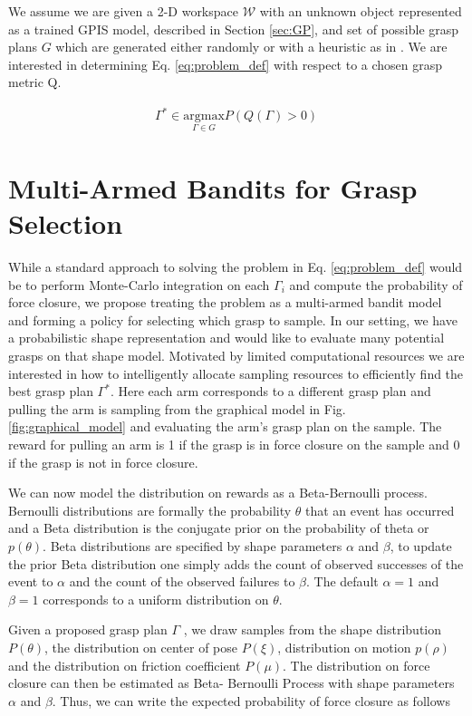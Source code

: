 \documentclass[journal,transmag]{IEEEtran}%
\begin{document}
We assume we are given a 2-D workspace $\mathcal{W}$ with an unknown object represented as a trained GPIS model, described in Section \ref{sec:GP}, and set of possible grasp plans $G$ which are generated either randomly or with a heuristic as in \cite{mahler2015gp}.
We are interested in determining Eq. \ref{eq:problem_def} with respect to a chosen grasp metric Q. 

\vspace{-2ex}
\begin{align}\label{eq:problem_def}
\Gamma^* \in \underset{\Gamma \in G}{\mbox{argmax}} P(Q(\Gamma)>0)
\end{align}





\section{Multi-Armed Bandits for Grasp Selection}
While a standard approach to solving the problem in Eq. \ref{eq:problem_def} would be to perform Monte-Carlo integration on each $\Gamma_i$ and compute the probability of force closure, we propose treating the problem as a multi-armed bandit model and forming a policy for selecting which grasp to sample. 
In our setting, we have a probabilistic shape representation and would like to evaluate many potential grasps on that shape model.
Motivated by limited computational resources we are interested in how to intelligently allocate sampling resources to efficiently find the best grasp plan $\Gamma^*$.
Here each arm corresponds to a different grasp plan and pulling the arm is sampling from the graphical model in Fig. \ref{fig:graphical_model} and evaluating the arm's grasp plan on the sample.
The reward for pulling an arm is 1 if the grasp is in force closure on the sample and 0 if the grasp is not in force closure. 

We can now model the distribution on rewards as a Beta-Bernoulli process. Bernoulli distributions are formally the probability $\theta$ that an event has occurred and a Beta distribution is the conjugate prior on the probability of theta or $p(\theta)$. Beta distributions are specified by shape parameters $\alpha$ and $\beta$, to update the prior Beta distribution one simply adds the count of observed successes of the event to $\alpha$ and the count of the observed failures to $\beta$. The default $\alpha =1 $ and $\beta =1$ corresponds to a uniform distribution on $\theta$. 

Given a proposed grasp plan $\Gamma$ , we draw samples from the shape distribution $P (\theta )$, the distribution on center of pose $P (\xi)$, distribution on motion $p(\rho)$ and the distribution on friction coefficient $P (\mu)$. The distribution on force closure can then be estimated as Beta- Bernoulli Process with shape parameters $\alpha$ and $\beta$. Thus, we can write the expected probability of force closure as follows
\end{document}
